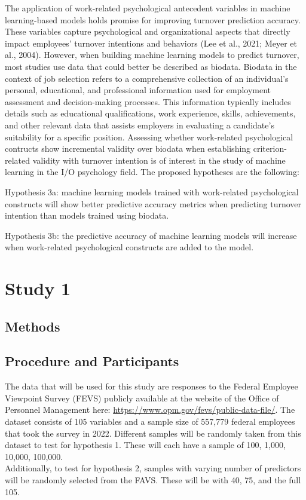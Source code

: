 \documentclass[
  man]{apa7}
\begin{document}
The application of work-related psychological antecedent variables in machine learning-based models holds promise for improving turnover prediction accuracy.
These variables capture psychological and organizational aspects that directly impact employees' turnover intentions and behaviors (Lee et al., 2021; Meyer et al., 2004). However, when building machine learning models to predict turnover, most studies use data that could better be described as biodata. Biodata in the context of job selection refers to a comprehensive collection of an individual's personal, educational, and professional information used for employment assessment and decision-making processes. This information typically includes details such as educational qualifications, work experience, skills, achievements, and other relevant data that assists employers in evaluating a candidate's suitability for a specific position.
Assessing whether work-related psychological contructs show incremental validity over biodata when establishing criterion-related validity with turnover intention is of interest in the study of machine learning in the I/O psychology field.
The proposed hypotheses are the following:

Hypothesis 3a: machine learning models trained with work-related psychological constructs will show better predictive accuracy metrics when predicting turnover intention than models trained using biodata.

Hypothesis 3b: the predictive accuracy of machine learning models will increase when work-related psychological constructs are added to the model.

\hypertarget{study-1}{%
\section{Study 1}\label{study-1}}

\hypertarget{methods}{%
\subsection{Methods}\label{methods}}

\hypertarget{procedure-and-participants}{%
\subsection{Procedure and Participants}\label{procedure-and-participants}}

The data that will be used for this study are responses to the Federal Employee Viewpoint Survey (FEVS) publicly available at the website of the Office of Personnel Management here: \url{https://www.opm.gov/fevs/public-data-file/}.
The dataset consists of 105 variables and a sample size of 557,779 federal employees that took the survey in 2022. Different samples will be randomly taken from this dataset to test for hypothesis 1. These will each have a sample of 100, 1,000, 10,000, 100,000.\\
Additionally, to test for hypothesis 2, samples with varying number of predictors will be randomly selected from the FAVS. These will be with 40, 75, and the full 105.
\end{document}
